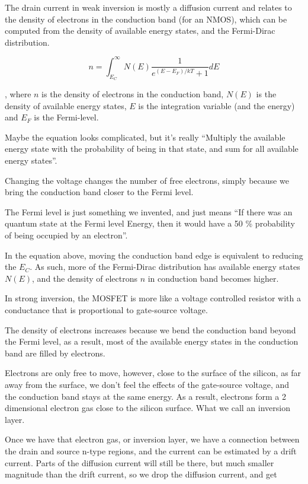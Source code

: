 The drain current in weak inversion is mostly a diffusion current and
relates to the density of electrons in the conduction band (for an
NMOS), which can be computed from the density of available energy
states, and the Fermi-Dirac distribution.

\[ n = \int_{E_C}^{\infty}N(E)\frac{1}{e^{(E-E_F)/kT}+1}dE\]

, where \(n\) is the density of electrons in the conduction band,
\(N(E)\) is the density of available energy states, \(E\) is the
integration variable (and the energy) and \(E_F\) is the Fermi-level.

Maybe the equation looks complicated, but it's really ``Multiply the
available energy state with the probability of being in that state, and
sum for all available energy states''.

Changing the voltage changes the number of free electrons, simply
because we bring the conduction band closer to the Fermi level.

The Fermi level is just something we invented, and just means ``If there
was an quantum state at the Fermi level Energy, then it would have a 50
\% probability of being occupied by an electron''.

In the equation above, moving the conduction band edge is equivalent to
reducing the \(E_C\). As such, more of the Fermi-Dirac distribution has
available energy states \(N(E)\), and the density of electrons \(n\) in
conduction band becomes higher.

In strong inversion, the MOSFET is more like a voltage controlled
resistor with a conductance that is proportional to gate-source voltage.

The density of electrons increases because we bend the conduction band
beyond the Fermi level, as a result, most of the available energy states
in the conduction band are filled by electrons.

Electrons are only free to move, however, close to the surface of the
silicon, as far away from the surface, we don't feel the effects of the
gate-source voltage, and the conduction band stays at the same energy.
As a result, electrons form a 2 dimensional electron gas close to the
silicon surface. What we call an inversion layer.

Once we have that electron gas, or inversion layer, we have a connection
between the drain and source n-type regions, and the current can be
estimated by a drift current. Parts of the diffusion current will still
be there, but much smaller magnitude than the drift current, so we drop
the diffusion current, and get

